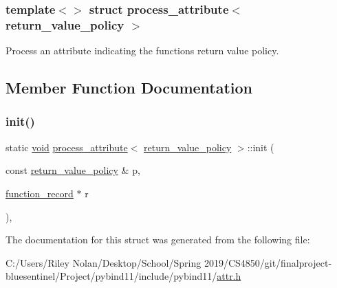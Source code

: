 \subsubsection*{template$<$$>$\newline
struct process\+\_\+attribute$<$ return\+\_\+value\+\_\+policy $>$}

Process an attribute indicating the function\textquotesingle{}s return value policy. 

\subsection{Member Function Documentation}
\mbox{\label{structprocess__attribute_3_01return__value__policy_01_4_a2e7b34a8067d2365b0b6ded2745c1134}} 
\subsubsection{\texorpdfstring{init()}{init()}}
{\footnotesize\ttfamily static \mbox{\hyperlink{_s_d_l__opengles2__gl2ext_8h_ae5d8fa23ad07c48bb609509eae494c95}{void}} \mbox{\hyperlink{structprocess__attribute}{process\+\_\+attribute}}$<$ \mbox{\hyperlink{detail_2common_8h_adde72ab1fb0dd4b48a5232c349a53841}{return\+\_\+value\+\_\+policy}} $>$\+::init (\begin{DoxyParamCaption}\item[{const \mbox{\hyperlink{detail_2common_8h_adde72ab1fb0dd4b48a5232c349a53841}{return\+\_\+value\+\_\+policy}} \&}]{p,  }\item[{\mbox{\hyperlink{structfunction__record}{function\+\_\+record}} $\ast$}]{r }\end{DoxyParamCaption})\hspace{0.3cm}{\ttfamily [inline]}, {\ttfamily [static]}}



The documentation for this struct was generated from the following file\+:\begin{DoxyCompactItemize}
\item 
C\+:/\+Users/\+Riley Nolan/\+Desktop/\+School/\+Spring 2019/\+C\+S4850/git/finalproject-\/bluesentinel/\+Project/pybind11/include/pybind11/\mbox{\hyperlink{attr_8h}{attr.\+h}}\end{DoxyCompactItemize}
